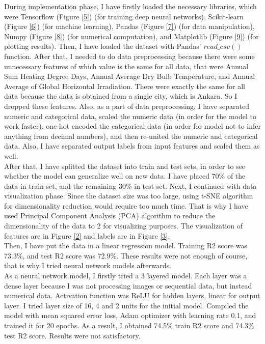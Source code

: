 \documentclass{article}
\begin{document}
During implementation phase, I have firstly loaded the necessary libraries, which were Tensorflow (Figure \ref{5}) (for training deep neural networks), Scikit-learn (Figure \ref{6}) (for machine learning), Pandas (Figure \ref{7}) (for data manipulation), Numpy (Figure \ref{8}) (for numerical computation), and Matplotlib (Figure \ref{9}) (for plotting results). Then, I have loaded the dataset with Pandas' $read\_csv()$ function. After that, I needed to do data preprocessing because there were some unnecessary features of which value is the same for all data, that were Annual Sum Heating Degree Days, Annual Average Dry Bulb Temperature, and Annual Average of Global Horizontal Irradiation. There were exactly the same for all data because the data is obtained from a single city, which is Ankara. So I dropped these features. Also, as a part of data preprocessing, I have separated numeric and categorical data, scaled the numeric data (in order for the model to work faster), one-hot encoded the categorical data (in order for model not to infer anything from decimal numbers), and then re-united the numeric and categorical data. Also, I have separated output labels from input features and scaled them as well.\\

After that, I have splitted the dataset into train and test sets, in order to see whether the model can generalize well on new data. I have placed 70\% of the data in train set, and the remaining 30\% in test set. Next, I continued with data visualization phase. Since the dataset size was too large, using t-SNE algorithm for dimensionality reduction would require too much time. That is why I have used Principal Component Analysis (PCA) algorithm to reduce the dimensionality of the data to 2 for visualizing purposes. The visualization of features are in Figure \ref{2} and labels are in Figure \ref{3}.\\

Then, I have put the data in a linear regression model. Training R2 score was 73.3\%, and test R2 score was 72.9\%. These results were not enough of course, that is why I tried neural network models afterwards.\\

As a neural network model, I firstly tried a 3 layered model. Each layer was a dense layer because I was not processing images or sequential data, but instead numerical data. Activation function was ReLU for hidden layers, linear for output layer. I tried layer size of 16, 4 and 2 units for the initial model. Compiled the model with mean squared error loss, Adam optimizer with learning rate 0.1, and trained it for 20 epochs. As a result, I obtained 74.5\% train R2 score and 74.3\% test R2 score. Results were not satisfactory.\\
\end{document}
